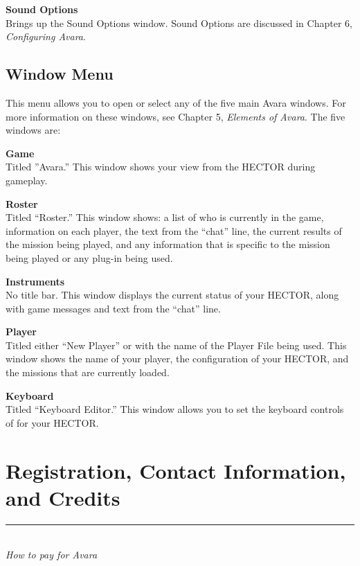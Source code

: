 \documentclass{article}
\let\oldsection\section
\renewcommand\section{\clearpage\oldsection}
\begin{document}
\textbf{Sound Options\hspace{1em}}\\
Brings up the Sound Options window. Sound Options are discussed in Chapter 6, \textit{Configuring Avara}.

\subsection{Window Menu}
This menu allows you to open or select any of the five main Avara windows. For more information on these windows, see Chapter 5, \textit{Elements of Avara}. The five windows are:

\textbf{Game\hspace{1em}}\\
Titled ''Avara.'' This window shows your view from the HECTOR during gameplay.

\textbf{Roster\hspace{1em}}\\
Titled ``Roster.'' This window shows: a list of who is currently in the game, information on each player, the text from the ``chat'' line, the current results of the mission being played, and any information that is specific to the mission being played or any plug-in being used.

\textbf{Instruments\hspace{1em}}\\
No title bar. This window displays the current status of your HECTOR, along with game messages and text from the ``chat'' line.

\textbf{Player\hspace{1em}}\\
Titled either ``New Player'' or with the name of the Player File being used. This window shows the name of your player, the configuration of your HECTOR, and the missions that are currently loaded.

\textbf{Keyboard\hspace{1em}}\\
Titled ``Keyboard Editor.'' This window allows you to set the keyboard controls of for your HECTOR.


\section{Registration, Contact Information, and Credits}
\rule{5.5cm}{.15pt}\\
\rmfamily\textit{How to pay for Avara}
\end{document}
